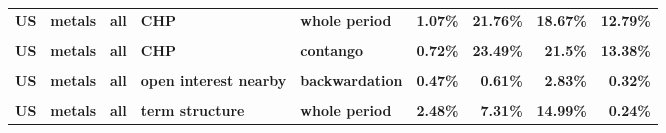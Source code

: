 \documentclass[
  authoryear,
  preprint,
  3p]{elsarticle}
\begin{document}
\begin{landscape}
\begin{longtable}[t]{>{}l>{}l>{}l>{}l>{}l>{}r>{}r>{}r>{}r}
\textbf{US} & \textbf{metals} & \textbf{all} & \textbf{CHP} & \textbf{whole period} & \textcolor[HTML]{4285f4}{\textbf{1.07\%}} & \textcolor[HTML]{4285f4}{\textbf{21.76\%}} & \textcolor[HTML]{4285f4}{\textbf{18.67\%}} & \textcolor[HTML]{4285f4}{\textbf{12.79\%}}\\
\textbf{\cellcolor{gray!10}{US}} & \textbf{\cellcolor{gray!10}{metals}} & \textbf{\cellcolor{gray!10}{all}} & \textbf{\cellcolor{gray!10}{CHP}} & \textbf{\cellcolor{gray!10}{backwardation}} & \textcolor[HTML]{4285f4}{\textbf{\cellcolor{gray!10}{1.66\%}}} & \textcolor[HTML]{4285f4}{\textbf{\cellcolor{gray!10}{20.33\%}}} & \textcolor[HTML]{4285f4}{\textbf{\cellcolor{gray!10}{15.15\%}}} & \textcolor[HTML]{4285f4}{\textbf{\cellcolor{gray!10}{12.71\%}}}\\
\textbf{US} & \textbf{metals} & \textbf{all} & \textbf{CHP} & \textbf{contango} & \textcolor[HTML]{4285f4}{\textbf{0.72\%}} & \textcolor[HTML]{4285f4}{\textbf{23.49\%}} & \textcolor[HTML]{4285f4}{\textbf{21.5\%}} & \textcolor[HTML]{4285f4}{\textbf{13.38\%}}\\
\textbf{\cellcolor{gray!10}{US}} & \textbf{\cellcolor{gray!10}{metals}} & \textbf{\cellcolor{gray!10}{all}} & \textbf{\cellcolor{gray!10}{open interest nearby}} & \textbf{\cellcolor{gray!10}{whole period}} & \textcolor[HTML]{4285f4}{\textbf{\cellcolor{gray!10}{0.5\%}}} & \textcolor[HTML]{4285f4}{\textbf{\cellcolor{gray!10}{0.91\%}}} & \textcolor[HTML]{4285f4}{\textbf{\cellcolor{gray!10}{3.68\%}}} & \textcolor[HTML]{4285f4}{\textbf{\cellcolor{gray!10}{0.27\%}}}\\
\addlinespace
\textbf{US} & \textbf{metals} & \textbf{all} & \textbf{open interest nearby} & \textbf{backwardation} & \textcolor[HTML]{4285f4}{\textbf{0.47\%}} & \textcolor[HTML]{4285f4}{\textbf{0.61\%}} & \textcolor[HTML]{4285f4}{\textbf{2.83\%}} & \textcolor[HTML]{4285f4}{\textbf{0.32\%}}\\
\textbf{\cellcolor{gray!10}{US}} & \textbf{\cellcolor{gray!10}{metals}} & \textbf{\cellcolor{gray!10}{all}} & \textbf{\cellcolor{gray!10}{open interest nearby}} & \textbf{\cellcolor{gray!10}{contango}} & \textcolor[HTML]{4285f4}{\textbf{\cellcolor{gray!10}{0.61\%}}} & \textcolor[HTML]{4285f4}{\textbf{\cellcolor{gray!10}{1.28\%}}} & \textcolor[HTML]{4285f4}{\textbf{\cellcolor{gray!10}{4.31\%}}} & \textcolor[HTML]{4285f4}{\textbf{\cellcolor{gray!10}{0.24\%}}}\\
\textbf{US} & \textbf{metals} & \textbf{all} & \textbf{term structure} & \textbf{whole period} & \textcolor[HTML]{4285f4}{\textbf{2.48\%}} & \textcolor[HTML]{4285f4}{\textbf{7.31\%}} & \textcolor[HTML]{4285f4}{\textbf{14.99\%}} & \textcolor[HTML]{4285f4}{\textbf{0.24\%}}\\

\end{longtable}
\end{landscape}
\end{document}
